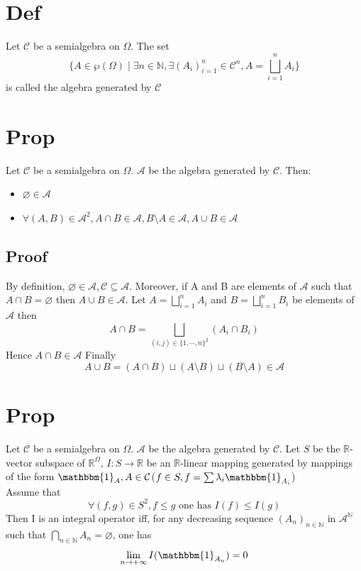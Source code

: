 \documentclass{book}
\begin{document}
\section{Def}
Let $\mathcal{C}$ be a semialgebra on $\Omega$. The set
$$\{A\in \wp(\Omega)\mid\exists n\in \mathbb{N},\exists(A_i)_{i=1}^n\in\mathcal{C}^n,A=\bigsqcup\limits_{i=1}^n A_i\}$$
is called the algebra generated by $\mathcal{C}$
\section{Prop}
Let $\mathcal{C}$ be a semialgebra on $\Omega$. $\mathcal{A}$ be the algebra generated by $\mathcal{C}$. Then:\begin{itemize}
    \item $\varnothing\in \mathcal{A}$
    \item $\forall(A,B)\in \mathcal{A}^2,A\cap B\in \mathcal{A},B\setminus A\in \mathcal{A},A\cup B\in \mathcal{A}$
\end{itemize}
\subsection*{Proof}
By definition, $\varnothing\in \mathcal{A},\mathcal{C}\subseteq \mathcal{A}$. Moreover, if A and B are elements of $\mathcal{A}$ such that $A\cap B=\varnothing$ then $A\cup B\in \mathcal{A}$. Let $A=\bigsqcup\limits_{i=1}^n A_i$  and $B=\bigsqcup\limits_{i=1}^n B_i$ be elements of $\mathcal{A}$ then 
$$A\cap B=\bigsqcup\limits_{(i,j)\in \{1,\cdots,n\}^2}(A_i\cap B_i)$$
Hence $A\cap B\in \mathcal{A}$
Finally
$$A\cup B=(A\cap B)\sqcup(A\setminus B)\sqcup(B\setminus A)\in \mathcal{A}$$
\section{Prop}
Let $\mathcal{C}$ be a semialgebra on $\Omega$. $\mathcal{A}$ be the algebra generated by $\mathcal{C}$. Let $S$ be the $\mathbb{R}$-vector subspace of $\mathbb{R}^\Omega$, $I:S\rightarrow \mathbb{R}$ be an $\mathbb{R}$-linear mapping generated by mappings of the form $\mathbbm{1}_A,A\in \mathcal{C}$($f\in S,f=\sum\lambda_i\mathbbm{1}_{A_i}$)\\
Assume that$$\forall (f,g)\in S^2,f\leq g \text{ one has } I(f)\leq I(g)$$
Then I is an integral operator iff, for any decreasing sequence $(A_n)_{n\in \mathbb{N}}$ in $\mathcal{A}^\mathbb{N}$ such that $\bigcap\limits_{n\in \mathbb{N}}A_n=\varnothing$, one has $$\lim\limits_{n\rightarrow+\infty}I(\mathbbm{1}_{A_n})=0$$
\end{document}
